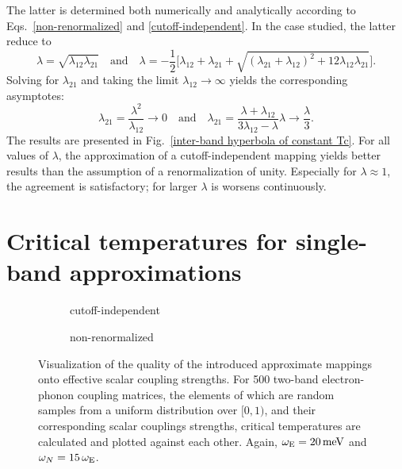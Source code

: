 The latter is determined both numerically and analytically according to
Eqs.~\ref{non-renormalized} and \ref{cutoff-independent}. In the case studied,
the latter reduce to
%
\begin{equation*}
    \lambda = \sqrt{\lambda_{1 2} \lambda_{2 1}}
    \quad \text{and} \quad
    \lambda = -\frac 1 2 \Big[ \lambda_{1 2} + \lambda_{2 1} + \sqrt{
        (\lambda_{2 1} + \lambda_{1 2})^2
        + 12 \lambda_{1 2} \lambda_{2 1}
        }
    \Big].
\end{equation*}
%
Solving for $\lambda_{2 1}$ and taking the limit $\lambda_{1 2} \rightarrow
\infty$ yields the corresponding asymptotes:
%
\begin{equation*}
    \lambda_{2 1} = \frac{\lambda^2}{\lambda_{1 2}} \rightarrow 0
    \quad \text{and} \quad
    \lambda_{2 1} = \frac{\lambda + \lambda_{1 2}}{3 \lambda_{1 2} - \lambda}
    \lambda \rightarrow \frac \lambda 3.
\end{equation*}
%
The results are presented in Fig.~\ref{inter-band hyperbola of constant Tc}. For
all values of $\lambda$, the approximation of a cutoff-independent mapping
yields better results than the assumption of a renormalization of unity.
Especially for $\lambda \approx 1$, the agreement is satisfactory; for larger
$\lambda$ is worsens continuously.

\section{Critical temperatures for single-band approximations}

\begin{figure}
    \small
    \begin{subfigure}{7cm}
        
        \caption{cutoff-independent}
    \end{subfigure}%
    \begin{subfigure}{7cm}
        
        \caption{non-renormalized}
    \end{subfigure}%
    \caption[Quality of the effective scalar coupling strengths]{
        Visualization of the quality of the introduced approximate mappings onto
        effective scalar coupling strengths. For 500 two-band electron-phonon
        coupling matrices, the elements of which are random samples from a
        uniform distribution over $[0, 1)$, and their corresponding scalar
        couplings strengths, critical temperatures are calculated and plotted
        against each other. Again, $\omega \sb{\text{E}} = 20 \, \mathrm{meV}$ and
        $\omega_N = 15 \, \omega \sb{\text{E}}$.}
\end{figure}
